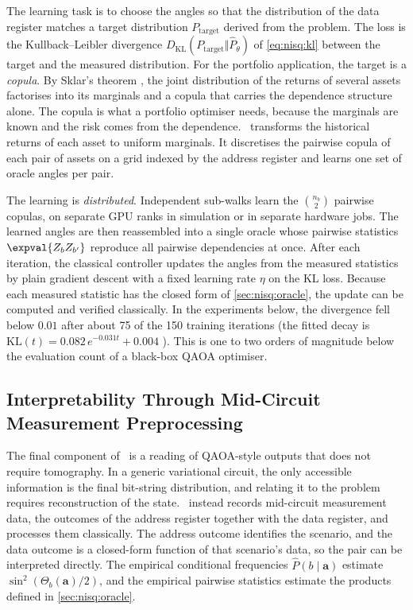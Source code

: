 The learning task is to choose the angles so that the distribution of the data register matches a target distribution $P_{\mathrm{target}}$ derived from the problem. The loss is the Kullback--Leibler divergence $D_{\mathrm{KL}}(P_{\mathrm{target}}\Vert\hat{P}_{\theta})$ of \cref{eq:nisq:kl} between the target and the measured distribution. For the portfolio application, the target is a \emph{copula}. By Sklar's theorem \cite{sklar1959copula}, the joint distribution of the returns of several assets factorises into its marginals and a copula that carries the dependence structure alone. The copula is what a portfolio optimiser needs, because the marginals are known and the risk comes from the dependence. \qawa\ transforms the historical returns of each asset to uniform marginals. It discretises the pairwise copula of each pair of assets on a grid indexed by the address register and learns one set of oracle angles per pair.

The learning is \emph{distributed}. Independent sub-walks learn the $\binom{n_{b}}{2}$ pairwise copulas, on separate GPU ranks in simulation or in separate hardware jobs. The learned angles are then reassembled into a single oracle whose pairwise statistics $\expval{Z_{b}Z_{b'}}$ reproduce all pairwise dependencies at once. After each iteration, the classical controller updates the angles from the measured statistics by plain gradient descent with a fixed learning rate $\eta$ on the KL loss. Because each measured statistic has the closed form of \cref{sec:nisq:oracle}, the update can be computed and verified classically. In the experiments below, the divergence fell below $0.01$ after about 75 of the 150 training iterations (the fitted decay is $\mathrm{KL}(t)=0.082\,e^{-0.031t}+0.004$ \cite{guo2025qawa}). This is one to two orders of magnitude below the evaluation count of a black-box QAOA optimiser.

\subsection{Interpretability Through Mid-Circuit Measurement Preprocessing}\label{sec:nisq:interp}

The final component of \qawa\ is a reading of QAOA-style outputs that does not require tomography. In a generic variational circuit, the only accessible information is the final bit-string distribution, and relating it to the problem requires reconstruction of the state. \qawa\ instead records mid-circuit measurement data, the outcomes of the address register together with the data register, and processes them classically. The address outcome identifies the scenario, and the data outcome is a closed-form function of that scenario's data, so the pair can be interpreted directly. The empirical conditional frequencies $\hat{P}(b\mid\bm{a})$ estimate $\sin^{2}(\Theta_{b}(\bm{a})/2)$, and the empirical pairwise statistics estimate the products defined in \cref{sec:nisq:oracle}.

